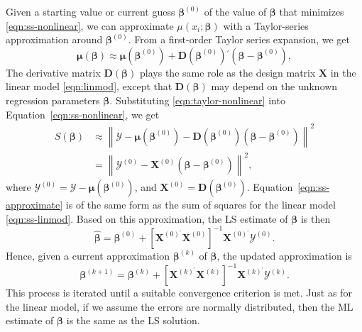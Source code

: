\documentclass[cmfont,usenames,dvipsnames,leqno]{afit-etd}\usepackage[]{graphicx}\usepackage[]{color}
\newcommand{\norm}[1]{\left\|#1\right\|}
\newcommand{\trans}{\ensuremath{^\prime}}
\newcommand{\bc}[1]{\ensuremath{\bm{\mathcal{#1}}}}
\newcommand{\wh}[1]{\ensuremath{\widehat{#1}}}
\newcommand{\X}{\ensuremath{\bm{X}}}
\begin{document}
Given a starting value or current guess $\bm{\beta}^{(0)}$ of the value of $\bm{\beta}$ that minimizes \eqref{eqn:ss-nonlinear}, we can approximate $\mu(x_i; \bm{\beta})$ with a Taylor-series approximation around $\bm{\beta}^{(0)}$. From a first-order Taylor series expansion, we get
\begin{equation}
\label{eqn:taylor-nonlinear}
  \bm{\mu}(\bm{\beta}) \approx \bm{\mu}(\bm{\beta}^{(0)}) + \bm{D}(\bm{\beta}^{(0)})\trans(\bm{\beta} -\bm{\beta}^{(0)}),
\end{equation}
The derivative matrix $\bm{D}(\bm{\beta})$ plays the same role as the design matrix $\X$ in the linear model \eqref{eqn:linmod}, except that $\bm{D}(\bm{\beta})$ may depend on the unknown regression parameters $\bm{\beta}$. Substituting \eqref{eqn:taylor-nonlinear} into Equation~\eqref{eqn:ss-nonlinear}, we get 
\begin{align}
  S(\bm{\beta}) &\approx \norm{\bc{Y} - \bm{\mu}(\bm{\beta}^{(0)}) - \bm{D}(\bm{\beta}^{(0)})(\bm{\beta} - \bm{\beta}^{(0)})}^2 \label{eqn:ss-approximate} \\
  &= \norm{\bc{Y}^{(0)} - \X^{(0)}(\bm{\beta} - \bm{\beta}^{(0)})}^2,
\end{align}
where $\bc{Y}^{(0)} = \bc{Y} - \bm{\mu}(\bm{\beta}^{(0)})$, and $\X^{(0)} = \bm{D}(\bm{\beta}^{(0)})$. Equation~\eqref{eqn:ss-approximate} is of the same form as the sum of squares for the linear model \eqref{eqn:ss-linmod}. Based on this approximation, the \ac{LS} estimate of $\bm{\beta}$ is then
\begin{equation*}
  \wh{\bm{\beta}} = \bm{\beta}^{(0)} + \left[ \X^{(0)\trans}\X^{(0)} \right]^{-1}\X^{(0)\trans}\bc{Y}^{(0)}.
\end{equation*}
Hence, given a current approximation $\bm{\beta}^{(k)}$ of $\bm{\beta}$, the updated approximation is 
\begin{equation*}
  \bm{\beta}^{(k + 1)} = \bm{\beta}^{(k)} + \left[ \X^{(k)\trans}\X^{(k)} \right]^{-1}\X^{(k)\trans}\bc{Y}^{(k)}.
\end{equation*}
This process is iterated until a suitable convergence criterion is met. Just as for the linear model, if we assume the errors are normally distributed, then the \ac{ML} estimate of  $\bm{\beta}$ is the same as the \ac{LS} solution.
\end{document}
